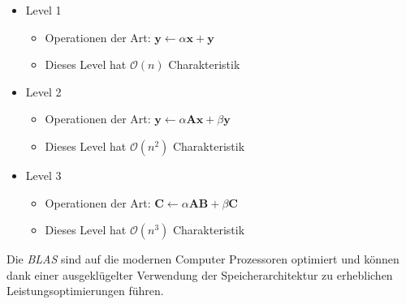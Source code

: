 \begin{itemize}
	\item Level 1
	\begin{itemize}
		\item Operationen der Art: $\mathbf{y} \leftarrow \alpha \mathbf{x}+\mathbf{y}$
		\item Dieses Level hat $\mathcal{O}(n)$ Charakteristik
	\end{itemize}
	\item Level 2
	\begin{itemize}
		\item Operationen der Art: $\mathbf{y} \leftarrow \alpha \mathbf{A}\mathbf{x}+\beta  \mathbf{y}$
		\item Dieses Level hat $\mathcal{O}(n^2)$ Charakteristik
		\end{itemize}
		\item Level 3
		\begin{itemize}
			\item Operationen der Art: $\mathbf{C} \leftarrow \alpha \mathbf{A}\mathbf{B}+\beta\mathbf{C}$
			\item Dieses Level hat $\mathcal{O}(n^3)$ Charakteristik
			\end{itemize}
\end{itemize}

Die \textit{BLAS} sind auf die modernen Computer Prozessoren optimiert und k\"onnen dank einer ausgeklügelter Verwendung der Speicherarchitektur zu erheblichen Leistungsoptimierungen f\"uhren.


%
%




